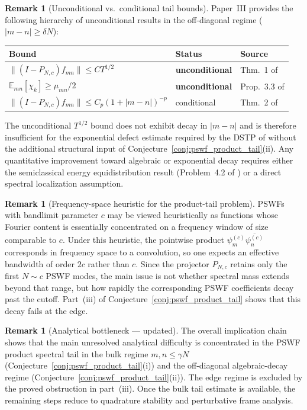 \documentclass[12pt,a4paper]{amsart}
\theoremstyle{definition}
\newtheorem{remark}[theorem]{Remark}
\newcommand{\PN}{P_{N,c}}
\begin{document}
\begin{remark}[Unconditional vs.\ conditional tail bounds]\label{rem:unconditional-gap}
Paper~III \cite{PaperIII} provides the following hierarchy
of unconditional results in the off-diagonal regime ($|m-n|\ge\delta N$):
\begin{center}
\renewcommand{\arraystretch}{1.3}
\begin{tabular}{lll}
\toprule
Bound & Status & Source \\
\midrule
$\|(I-\PN)f_{mn}\|\le CT^{1/2}$ & \textbf{unconditional} & Thm.~1 of \cite{PaperIII} \\
$\mathbb{E}_{mn}[\chi_k]\ge\mu_{mn}/2$ & \textbf{unconditional} & Prop.~3.3 of \cite{PaperIII} \\
$\|(I-\PN)f_{mn}\|\le C_p(1+|m-n|)^{-p}$ & conditional & Thm.~2 of \cite{PaperIII} \\
\bottomrule
\end{tabular}
\end{center}
The unconditional $T^{1/2}$ bound does not exhibit decay in $|m-n|$
and is therefore insufficient for the exponential defect estimate
required by the DSTP of \cite{PaperI} without the additional structural
input of Conjecture~\ref{conj:pswf_product_tail}(ii).
Any quantitative improvement toward algebraic or exponential decay
requires either the semiclassical energy equidistribution result
(Problem~4.2 of \cite{PaperIII}) or a direct spectral localization
assumption.
\end{remark}

\begin{remark}[Frequency-space heuristic for the product-tail problem]
PSWFs with bandlimit parameter $c$ may be viewed heuristically as functions
whose Fourier content is essentially concentrated on a frequency window of
size comparable to $c$. Under this heuristic, the pointwise product
$\psi_m^{(c)}\overline{\psi_n^{(c)}}$ corresponds in frequency space to a
convolution, so one expects an effective bandwidth of order $2c$ rather
than $c$. Since the projector $\PN$ retains only the first $N\sim c$ PSWF
modes, the main issue is not whether spectral mass extends beyond that
range, but how rapidly the corresponding PSWF coefficients decay past the
cutoff. Part~(iii) of Conjecture~\ref{conj:pswf_product_tail} shows that
this decay fails at the edge.
\end{remark}

\begin{remark}[Analytical bottleneck --- updated]\label{rem:bottleneck-implication}
The overall implication chain shows that the main unresolved analytical
difficulty is concentrated in the PSWF product spectral tail in the
bulk regime $m,n\le\gamma N$ (Conjecture~\ref{conj:pswf_product_tail}(i))
and the off-diagonal algebraic-decay regime
(Conjecture~\ref{conj:pswf_product_tail}(ii)).
The edge regime is excluded by the proved obstruction in part~(iii).
Once the bulk tail estimate is available, the remaining steps
reduce to quadrature stability and perturbative frame analysis.
\end{remark}
\end{document}
